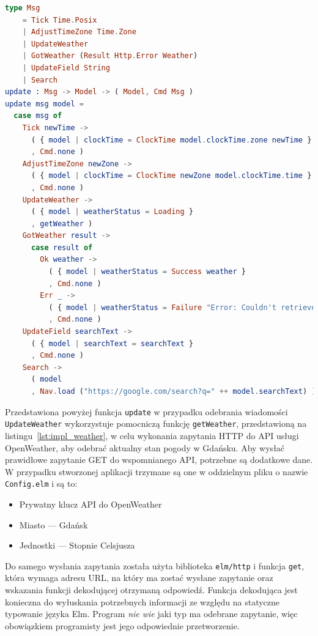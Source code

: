 \documentclass[twoside,a4paper]{report}
\begin{document}
\begin{lstlisting}[caption={Implementacja typu \texttt{Msg} i funkcji \texttt{update}},label={lst:impl_update},language={Elm}]
type Msg
    = Tick Time.Posix
    | AdjustTimeZone Time.Zone
    | UpdateWeather
    | GotWeather (Result Http.Error Weather)
    | UpdateField String
    | Search
update : Msg -> Model -> ( Model, Cmd Msg )
update msg model =
  case msg of
    Tick newTime ->
      ( { model | clockTime = ClockTime model.clockTime.zone newTime }
      , Cmd.none )
    AdjustTimeZone newZone ->
      ( { model | clockTime = ClockTime newZone model.clockTime.time }
      , Cmd.none )
    UpdateWeather ->
      ( { model | weatherStatus = Loading }
      , getWeather )
    GotWeather result ->
      case result of
        Ok weather ->
          ( { model | weatherStatus = Success weather }
          , Cmd.none )
        Err _ ->
          ( { model | weatherStatus = Failure "Error: Couldn't retrieve weather data" }
          , Cmd.none )
    UpdateField searchText ->
      ( { model | searchText = searchText }
      , Cmd.none )
    Search ->
      ( model
      , Nav.load ("https://google.com/search?q=" ++ model.searchText) )
\end{lstlisting}

Przedstawiona powyżej funkcja \texttt{update} w przypadku odebrania wiadomości \texttt{UpdateWeather} wykorzystuje pomocniczą funkcję \texttt{getWeather}, przedstawioną na listingu~\ref{lst:impl_weather}, w celu wykonania zapytania HTTP do API usługi OpenWeather, aby odebrać aktualny stan pogody w Gdańsku.
Aby wysłać prawidłowe zapytanie GET do wspomnianego API, potrzebne są dodatkowe dane.
W przypadku stworzonej aplikacji trzymane są one w oddzielnym pliku o nazwie \texttt{Config.elm} i są to:
\begin{itemize}[noitemsep,topsep=0pt]
    \item Prywatny klucz API do OpenWeather
    \item Miasto --- Gdańsk
    \item Jednostki --- Stopnie Celsjusza
\end{itemize}

Do samego wysłania zapytania została użyta biblioteka \texttt{elm/http} i funkcja \texttt{get}, która wymaga adresu URL, na który ma zostać wysłane zapytanie oraz wskazania funkcji dekodującej otrzymaną odpowiedź.
Funkcja dekodująca jest konieczna do wyłuskania potrzebnych informacji ze względu na statyczne typowanie języka Elm.
Program \textit{nie wie} jaki typ ma odebrane zapytanie, więc obowiązkiem programisty jest jego odpowiednie przetworzenie.
\end{document}
